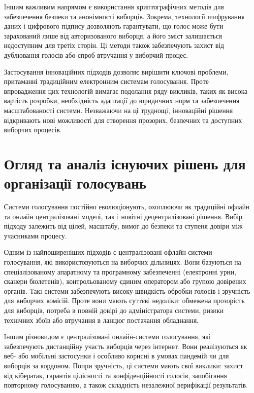 \documentclass[14pt]{extreport}
\begin{document}
  Іншим важливим напрямом є використання криптографічних методів для забезпечення безпеки та анонімності виборців. Зокрема, технології шифрування даних і цифрового підпису дозволяють гарантувати, що голос може бути зарахований лише від авторизованого виборця, а його зміст залишається недоступним для третіх сторін. Ці методи також забезпечують захист від дублювання голосів або спроб втручання у виборчий процес.

  Застосування інноваційних підходів дозволяє вирішити ключові проблеми, притаманні традиційним електронним системам голосування. Проте впровадження цих технологій вимагає подолання ряду викликів, таких як висока вартість розробки, необхідність адаптації до юридичних норм та забезпечення масштабованості системи. Незважаючи на ці труднощі, інноваційні рішення відкривають нові можливості для створення прозорих, безпечних та доступних виборчих процесів.
  
  \section{Огляд та аналіз існуючих рішень для організації голосувань}

  Системи голосування постійно еволюціонують, охоплюючи як традиційні офлайн та онлайн централізовані моделі, так і новітні децентралізовані рішення. Вибір підходу залежить від цілей, масштабу, вимог до безпеки та ступеня довіри між учасниками процесу.

  Одним із найпоширеніших підходів є централізовані офлайн-системи голосування, які використовуються на виборчих дільницях. Вони базуються на спеціалізованому апаратному та програмному забезпеченні (електронні урни, сканери бюлетенів), контрольованому єдиним оператором або групою довірених органів. Такі системи забезпечують високу швидкість обробки голосів і зручність для виборчих комісій. Проте вони мають суттєві недоліки: обмежена прозорість для виборців, потреба в повній довірі до адміністратора системи, ризики технічних збоїв або втручання в ланцюг постачання обладнання.

  Іншим різновидом є централізовані онлайн-системи голосування, які забезпечують дистанційну участь виборців через інтернет. Вони реалізуються як веб- або мобільні застосунки і особливо корисні в умовах пандемій чи для виборців за кордоном. Попри зручність, ці системи мають свої виклики: захист від кібератак, гарантія цілісності та конфіденційності голосів, запобігання повторному голосуванню, а також складність незалежної верифікації результатів.
  
\end{document}
